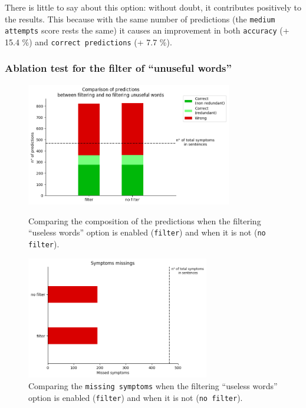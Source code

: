 
There is little to say about this option: without doubt, it contributes positively to the results. This because with the same number of predictions (the \texttt{medium attempts} score rests the same) it causes an improvement in both \texttt{accuracy} (+ 15.4 \%) and \texttt{correct predictions} (+ 7.7 \%).


\newpage
\subsubsection{Ablation test for the filter of ``unuseful words''}
\begin{figure}[h]%
  \centering
  \begin{minipage}[b]{0.4\textwidth}
    \includegraphics[width=9cm]{graphs/comparison_filtering}
    \caption{Comparing the composition of the predictions when the filtering ``useless words'' option is enabled (\texttt{filter}) and when it is not (\texttt{no filter}).}
  \end{minipage}
  \hfill
  \begin{minipage}[b]{0.4\textwidth}
    \includegraphics[width=8cm]{graphs/comparison_filtering_missings}
    \caption{Comparing the \texttt{missing symptoms} when the filtering ``useless words'' option is enabled (\texttt{filter}) and when it is not (\texttt{no filter}).}
  \end{minipage}
\end{figure}


